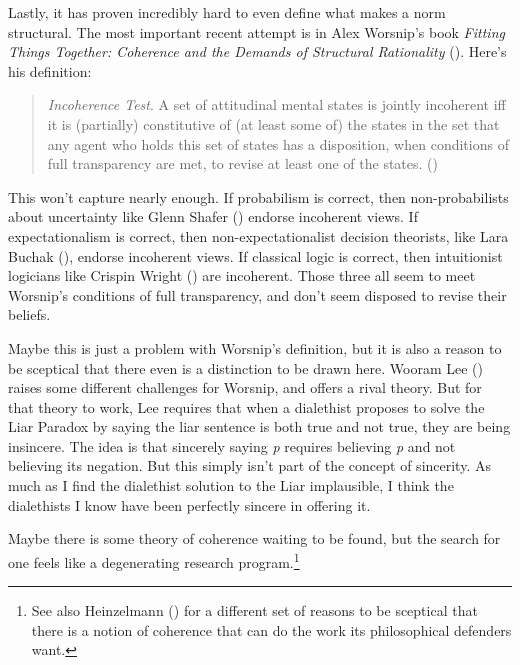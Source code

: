 \documentclass[
  12pt,
  letterpaper,
  DIV=11,
  numbers=noendperiod]{scrreprt}
\begin{document}
Lastly, it has proven incredibly hard to even define what makes a norm
structural. The most important recent attempt is in Alex Worsnip's book
\emph{Fitting Things Together: Coherence and the Demands of Structural
Rationality} (). Here's his
definition:

\begin{quote}
\emph{Incoherence Test}. A set of attitudinal mental states is jointly
incoherent iff it is (partially) constitutive of (at least some of) the
states in the set that any agent who holds this set of states has a
disposition, when conditions of full transparency are met, to revise at
least one of the states. ()
\end{quote}

This won't capture nearly enough. If probabilism is correct, then
non-probabilists about uncertainty like Glenn Shafer
() endorse incoherent views. If
expectationalism is correct, then non-expectationalist decision
theorists, like Lara Buchak (), endorse
incoherent views. If classical logic is correct, then intuitionist
logicians like Crispin Wright
() are incoherent. Those
three all seem to meet Worsnip's conditions of full transparency, and
don't seem disposed to revise their beliefs.

Maybe this is just a problem with Worsnip's definition, but it is also a
reason to be sceptical that there even is a distinction to be drawn
here. Wooram Lee () raises some different
challenges for Worsnip, and offers a rival theory. But for that theory
to work, Lee requires that when a dialethist proposes to solve the Liar
Paradox by saying the liar sentence is both true and not true, they are
being insincere. The idea is that sincerely saying \emph{p} requires
believing \emph{p} and not believing its negation. But this simply isn't
part of the concept of sincerity. As much as I find the dialethist
solution to the Liar implausible, I think the dialethists I know have
been perfectly sincere in offering it.

Maybe there is some theory of coherence waiting to be found, but the
search for one feels like a degenerating research program.\footnote{See
  also Heinzelmann () for a different
  set of reasons to be sceptical that there is a notion of coherence
  that can do the work its philosophical defenders want.}
\end{document}
